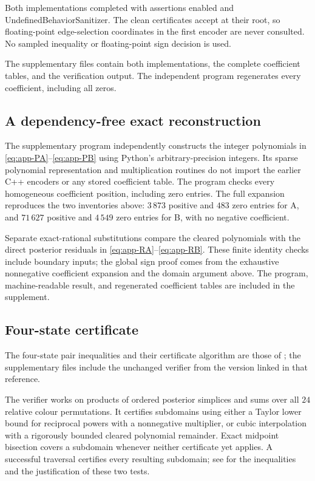 Both implementations completed with assertions enabled and
UndefinedBehaviorSanitizer.  The clean certificates accept at their root,
so floating-point edge-selection coordinates in the first encoder are
never consulted.  No sampled inequality or floating-point sign decision
is used.

The supplementary files contain both implementations, the complete coefficient tables, and the verification output. The independent program regenerates every coefficient, including all zeros.

\subsection{A dependency-free exact reconstruction}

The supplementary program  independently constructs the integer polynomials in \eqref{eq:app-PA}--\eqref{eq:app-PB} using Python's arbitrary-precision integers. Its sparse polynomial representation and multiplication routines do not import the earlier C++ encoders or any stored coefficient table. The program checks every homogeneous coefficient position, including zero entries. The full expansion reproduces the two inventories above: $3\,873$ positive and $483$ zero entries for A, and $71\,627$ positive and $4\,549$ zero entries for B, with no negative coefficient.

Separate exact-rational substitutions compare the cleared polynomials with the direct posterior residuals in \eqref{eq:app-RA}--\eqref{eq:app-RB}. These finite identity checks include boundary inputs; the global sign proof comes from the exhaustive nonnegative coefficient expansion and the domain argument above. The program, machine-readable result, and regenerated coefficient tables are included in the supplement.

\subsection{Four-state certificate}

The four-state pair inequalities and their certificate algorithm are those of \cite{OpenAI4}; the supplementary files include the unchanged verifier from the version linked in that reference.

The verifier works on products of ordered posterior simplices and sums
over all \(24\) relative colour permutations.  It certifies subdomains
using either a Taylor lower bound for reciprocal powers with a
nonnegative multiplier, or cubic interpolation with a rigorously bounded
cleared polynomial remainder.  Exact midpoint bisection covers a
subdomain whenever neither certificate yet applies.  A successful
traversal certifies every resulting subdomain; see \cite{OpenAI4} for the
inequalities and the justification of these two tests.

